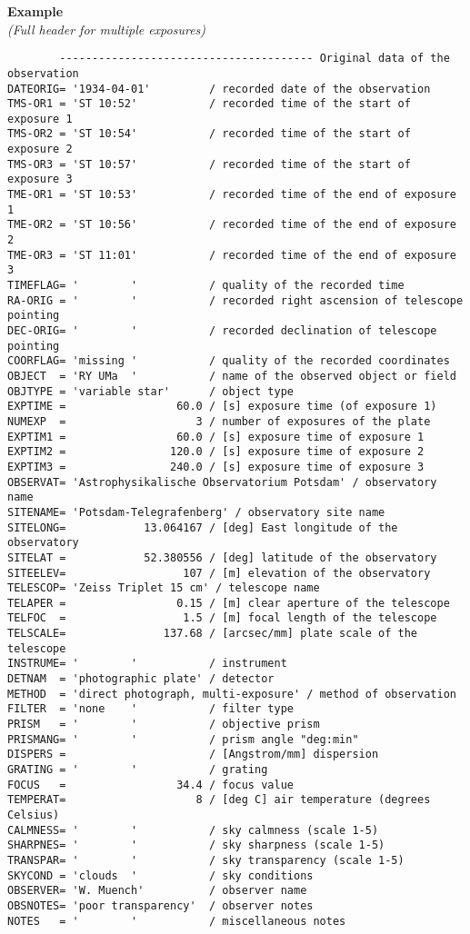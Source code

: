 \documentclass[11pt]{ivoa}
\newenvironment{fitsexample}[1]
{\bigskip\noindent\textbf{Example}\\\textit{(#1\smallskip)}}
{\medskip}
\begin{document}
\begin{fitsexample}{Full header for multiple exposures}
\begin{lstlisting}
        --------------------------------------- Original data of the observation
DATEORIG= '1934-04-01'         / recorded date of the observation
TMS-OR1 = 'ST 10:52'           / recorded time of the start of exposure 1
TMS-OR2 = 'ST 10:54'           / recorded time of the start of exposure 2
TMS-OR3 = 'ST 10:57'           / recorded time of the start of exposure 3
TME-OR1 = 'ST 10:53'           / recorded time of the end of exposure 1
TME-OR2 = 'ST 10:56'           / recorded time of the end of exposure 2
TME-OR3 = 'ST 11:01'           / recorded time of the end of exposure 3
TIMEFLAG= '        '           / quality of the recorded time
RA-ORIG = '        '           / recorded right ascension of telescope pointing
DEC-ORIG= '        '           / recorded declination of telescope pointing
COORFLAG= 'missing '           / quality of the recorded coordinates
OBJECT  = 'RY UMa  '           / name of the observed object or field
OBJTYPE = 'variable star'      / object type
EXPTIME =                 60.0 / [s] exposure time (of exposure 1)
NUMEXP  =                    3 / number of exposures of the plate
EXPTIM1 =                 60.0 / [s] exposure time of exposure 1
EXPTIM2 =                120.0 / [s] exposure time of exposure 2
EXPTIM3 =                240.0 / [s] exposure time of exposure 3
OBSERVAT= 'Astrophysikalische Observatorium Potsdam' / observatory name
SITENAME= 'Potsdam-Telegrafenberg' / observatory site name
SITELONG=            13.064167 / [deg] East longitude of the observatory
SITELAT =            52.380556 / [deg] latitude of the observatory
SITEELEV=                  107 / [m] elevation of the observatory
TELESCOP= 'Zeiss Triplet 15 cm' / telescope name
TELAPER =                 0.15 / [m] clear aperture of the telescope
TELFOC  =                  1.5 / [m] focal length of the telescope
TELSCALE=               137.68 / [arcsec/mm] plate scale of the telescope
INSTRUME= '        '           / instrument
DETNAM  = 'photographic plate' / detector
METHOD  = 'direct photograph, multi-exposure' / method of observation
FILTER  = 'none    '           / filter type
PRISM   = '        '           / objective prism
PRISMANG= '        '           / prism angle "deg:min"
DISPERS =                      / [Angstrom/mm] dispersion
GRATING = '        '           / grating
FOCUS   =                 34.4 / focus value
TEMPERAT=                    8 / [deg C] air temperature (degrees Celsius)
CALMNESS= '        '           / sky calmness (scale 1-5)
SHARPNES= '        '           / sky sharpness (scale 1-5)
TRANSPAR= '        '           / sky transparency (scale 1-5)
SKYCOND = 'clouds  '           / sky conditions
OBSERVER= 'W. Muench'          / observer name
OBSNOTES= 'poor transparency'  / observer notes
NOTES   = '        '           / miscellaneous notes
\end{lstlisting}
\end{fitsexample}
\end{document}
